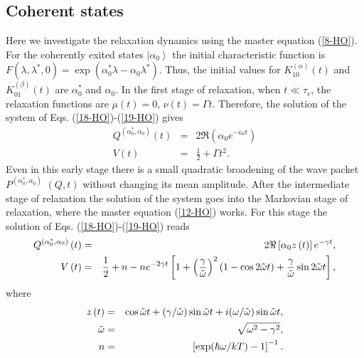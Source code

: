 \documentclass[12pt,twoside,a4paper]{report}
\begin{document}
\subsection{Coherent states\label{quant-coher}}
Here we 
investigate
the relaxation dynamics 
using
the master equation (\ref{8-HO}).
For the coherently exited states $\left| \alpha _0\right\rangle $ the
initial characteristic function is 
$F\left( \lambda ,\lambda^{*},0\right) 
  =\exp 
     \left(
         \alpha _0^{*}\lambda - \alpha _0\lambda^{*}
     \right) $. 
Thus, the initial values for 
$K_{10}^{(\alpha)}\left( t\right) $ 
and $K_{01}^{(\beta )}\left( t\right) $ 
are $\alpha _0^{*}$ and $\alpha _0$.  
In the first stage of relaxation, when $t\ll \tau _c$, 
the relaxation functions are  
$
\mu\left( t\right)=0$,  
$    \nu \left( t\right) 
    =\Gamma
t $.
Therefore, the solution of the system of Eqs. (\ref{18-HO})-(\ref{19-HO}) 
gives
\begin{eqnarray}
  Q^{(\alpha _0^{*},\alpha _0)}\left( t\right) 
    &=&2{\Re}\left(
                  \alpha_0 e^{-{{i}}\omega t}
              \right) \nonumber \\ 
  V\left( t\right) 
    &=&\frac12 + \Gamma
t^2.
\label{26-HO}
\end{eqnarray}
Even in this early stage there is a small quadratic broadening of the
wave packet 
$P^{
  \left( 
      \alpha _0^{*},\alpha _0
  \right) }
$
$
  \left(  
      Q,t 
  \right) $ 
without changing its mean amplitude.  After the
intermediate stage of relaxation the solution of the system goes into
the Markovian stage of relaxation, where the master equation (\ref{12-HO}) 
works.
For this stage the solution of Eqs. (\ref{18-HO})-(\ref{19-HO}) reads
\begin{eqnarray}
  Q^{\left( \alpha _0^{*},\alpha _0\right) }\left( t\right)
  &=& 2{\Re}\left[ \alpha _0z\left( t\right) \right] e^{-\gamma t},
\nonumber \\
V\left( t\right) &=& \frac 12+n-ne^{-2\gamma t}\left[ 1+\left( \frac \gamma {%
      \tilde{\omega}}\right) ^2\left( 1-\cos 2\tilde{\omega}t\right)
  +\frac \gamma {\tilde{\omega}}\sin 2\tilde{\omega}t\right] ,
\label{28-HO}
\end{eqnarray}
where
\begin{eqnarray}
z\left( t\right) & = & \cos \tilde{\omega}t+(\gamma /\tilde{\omega})\sin \tilde{%
  \omega}t+{{i}}(\omega /\tilde{\omega})\sin \tilde{\omega}t,
\nonumber
\\
\tilde{\omega}   & = & \sqrt{\omega ^2-\gamma ^2}, \label{29-HO}
\\
               n & = & \left[\exp (\hbar \omega/kT)-1\right]^{-1}.
\nonumber
\end{eqnarray}
\end{document}
